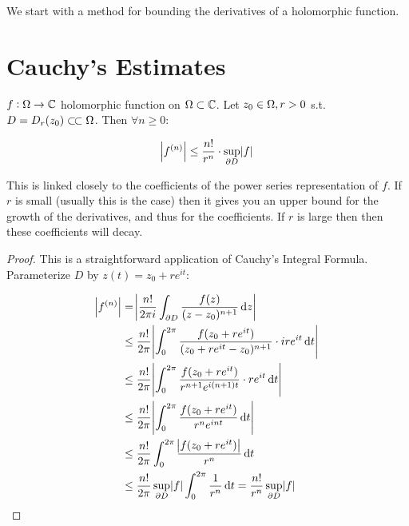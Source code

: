 \setcounter{section}{0}
\setcounter{theorem}{0}


We start with a method for bounding the derivatives of a holomorphic function.

\section{Cauchy's Estimates}


\begin{theorem}

$f:\Omega \rightarrow \mathbb{C}$ holomorphic function on $\Omega \subset \mathbb{C}$. Let $z_0 \in \Omega, r>0 $ s.t. $D=D_r(z_0) \ssubset \om$. Then $\forall n\geq 0$:

\begin{align*}
    \abs{f^{(n)}} \leq \frac{n!}{r^n} \cdot \sup_{\partial D}\abs{f}
\end{align*}

\end{theorem}


\begin{note}
This is linked closely to the coefficients of the power series representation of $f$. If $r$ is small (usually this is the case) then it gives you an upper bound for the growth of the derivatives, and thus for the coefficients. If $r$ is large then then these coefficients will decay.
\end{note}


\begin{proof}
This is a straightforward application of Cauchy's Integral Formula. Parameterize $D$ by $z(t) = z_0 +re^{it}$:

\begin{align*}
    \abs{f^{(n)}} &= \abs{\frac{n!}{2\pi i} \int_{\partial D} \frac{f(z)}{(z-z_0)^{n+1}} \dif z }\\
    &\leq \frac{n!}{2\pi} \abs{\int_{0}^{2\pi} \frac{f(z_0 +re^{it})}{(z_0 +re^{it}-z_0)^{n+1}} \cdot i r e^{it} \dif t }\\
    &\leq \frac{n!}{2\pi} \abs{\int_{0}^{2\pi} \frac{f(z_0 +re^{it})}{r^{n+1}e^{i(n+1)t}} \cdot r e^{it} \dif t }\\
    &\leq  \frac{n!}{2\pi} \abs{\int_{0}^{2\pi} \frac{f(z_0 +re^{it})}{r^{n}e^{int}} \dif t }\\
    &\leq \frac{n!}{2\pi} \int_{0}^{2\pi}  \frac{\abs{ f(z_0 +re^{it})  }}{r^{n}} \dif t \\
    &\leq \frac{n!}{2\pi} \sup_{\partial D}\abs{f} \int_{0}^{2\pi}  \frac{1}{r^{n}} \dif t  = \frac{n!}{r^n} \sup_{\partial D}\abs{f}\\
\end{align*}
\end{proof}

